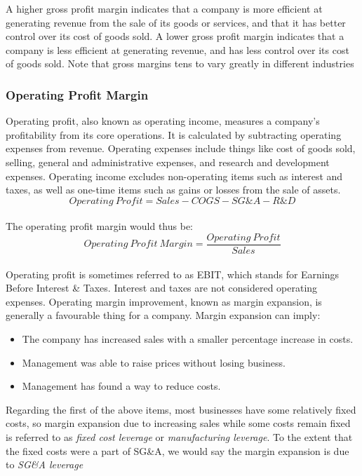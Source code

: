 \documentclass{article}
\begin{document}
A higher gross profit margin indicates that a company is more efficient at generating revenue from the sale of its goods or services, and that it has better control over its cost of goods sold. A lower gross profit margin indicates that a company is less efficient at generating revenue, and has less control over its cost of goods sold. Note that gross margins tens to vary greatly in different industries

\subsubsection{Operating Profit Margin}
Operating profit, also known as operating income, measures a company's profitability from its core operations. It is calculated by subtracting operating expenses from revenue. Operating expenses include things like cost of goods sold, selling, general and administrative expenses, and research and development expenses. Operating income excludes non-operating items such as interest and taxes, as well as one-time items such as gains or losses from the sale of assets.
\begin{equation}
    Operating\: Profit = Sales - COGS - SG\&A - R\&D
\end{equation}\\

The operating profit margin would thus be:
\begin{equation}
    Operating\:Profit\:Margin = \frac{Operating\:Profit}{Sales}
\end{equation}\\

Operating profit is sometimes referred to as EBIT, which stands for Earnings Before Interest \& Taxes. Interest and taxes are not considered operating expenses. Operating margin improvement, known as margin expansion, is generally a favourable thing for a company. Margin expansion can imply:
\begin{itemize}
\item The company has increased sales with a smaller percentage increase in costs.
\item Management was able to raise prices without losing business.
\item Management has found a way to reduce costs.
\end{itemize}

Regarding the first of the above items, most businesses have some relatively fixed costs, so margin expansion due to increasing sales while some costs remain fixed is referred to as \textit{fixed cost leverage} or \textit{manufacturing leverage}. To the extent that the fixed costs were a part of SG\&A, we would say the margin expansion is due to \textit{SG\&A leverage}
\end{document}
